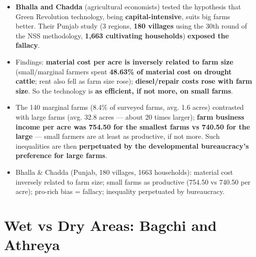 \begin{KeyConcept}
\begin{itemize}
\item \textbf{Bhalla and Chadda} (agricultural economists) tested the hypothesis that Green Revolution technology, being \textbf{capital-intensive}, suits big farms better. Their Punjab study (3 regions, \textbf{180 villages} using the 30th round of the NSS methodology, \textbf{1,663 cultivating households}) \textbf{exposed the fallacy}.
\item Findings: \textbf{material cost per acre is inversely related to farm size} (small/marginal farmers spent \textbf{48.63\% of material cost on drought cattle}; rent also fell as farm size rose); \textbf{diesel/repair costs rose with farm size}. So the technology is \textbf{as efficient, if not more, on small farms}.
\item The 140 marginal farms (8.4\% of surveyed farms, avg. 1.6 acres) contrasted with large farms (avg. 32.8 acres --- about 20 times larger); \textbf{farm business income per acre was \rupee{}754.50 for the smallest farms vs \rupee{}740.50 for the large} --- small farmers are at least as productive, if not more. Such inequalities are then \textbf{perpetuated by the developmental bureaucracy's preference for large farms}.
\end{itemize}
\end{KeyConcept}

\begin{QuickRevision}
\begin{itemize}
\item Bhalla \& Chadda (Punjab, 180 villages, 1663 households): material cost inversely related to farm size; small farms as productive (\rupee{}754.50 vs \rupee{}740.50 per acre); pro-rich bias = fallacy; inequality perpetuated by bureaucracy.
\end{itemize}
\end{QuickRevision}

\section{Wet vs Dry Areas: Bagchi and Athreya}

